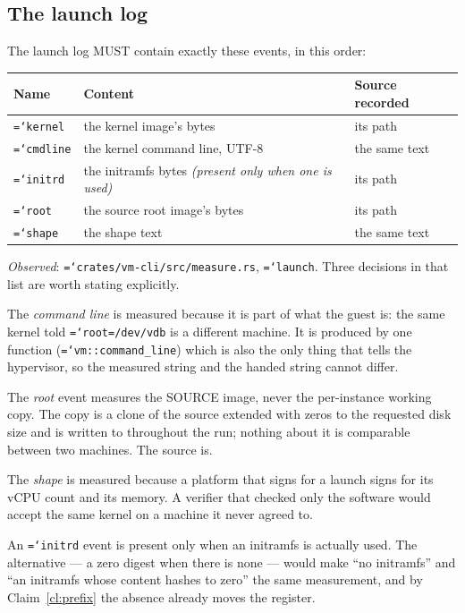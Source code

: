 \documentclass[11pt,a4paper]{article}
\newcommand{\code}[1]{\texttt{\hyphenchar\font=`\-\relax #1}}
\begin{document}
\subsection{The launch log}

The launch log MUST contain exactly these events, in this order:

\begin{center}
\begin{tabular}{@{}lll@{}}
\toprule
Name & Content & Source recorded \\
\midrule
\code{kernel}  & the kernel image's bytes            & its path \\
\code{cmdline} & the kernel command line, UTF-8      & the same text \\
\code{initrd}  & the initramfs bytes \emph{(present only when one is used)} & its path \\
\code{root}    & the source root image's bytes       & its path \\
\code{shape}   & the shape text                      & the same text \\
\bottomrule
\end{tabular}
\end{center}

\emph{Observed}: \code{crates/vm-cli/src/measure.rs}, \code{launch}. Three
decisions in that list are worth stating explicitly.

The \emph{command line} is measured because it is part of what the guest is: the
same kernel told \code{root=/dev/vdb} is a different machine. It is produced by
one function (\code{vm::command\_line}) which is also the only thing that tells
the hypervisor, so the measured string and the handed string cannot differ.

The \emph{root} event measures the SOURCE image, never the per-instance working
copy. The copy is a clone of the source extended with zeros to the requested disk
size and is written to throughout the run; nothing about it is comparable between
two machines. The source is.

The \emph{shape} is measured because a platform that signs for a launch signs for
its vCPU count and its memory. A verifier that checked only the software would
accept the same kernel on a machine it never agreed to.

An \code{initrd} event is present only when an initramfs is actually used. The
alternative --- a zero digest when there is none --- would make ``no initramfs''
and ``an initramfs whose content hashes to zero'' the same measurement, and by
Claim~\ref{cl:prefix} the absence already moves the register.
\end{document}
